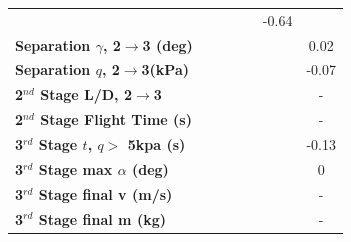 \begin{table}[ht]
\begin{tabular}{l c c c c c c}
	& \secondthirdSeparationvCdThreeNinetyNoReturn
	& \secondthirdSeparationvCdThreeStandardNoReturn
	& \secondthirdSeparationvCdThreeOneHundredTenNoReturn
	& \secondthirdSeparationvCdThreeOneHundredTwentyNoReturn
	&-0.64
	\\
	\textbf{Separation $\gamma$, 2$\rightarrow$3 (deg)}
	& \secondthirdSeparationgammaCdThreeEightyNoReturn
	& \secondthirdSeparationgammaCdThreeNinetyNoReturn
	& \secondthirdSeparationgammaCdThreeStandardNoReturn
	& \secondthirdSeparationgammaCdThreeOneHundredTenNoReturn
	& \secondthirdSeparationgammaCdThreeOneHundredTwentyNoReturn
	&0.02
	\\
	\textbf{Separation $q$, 2$\rightarrow$3(kPa)}
	& \secondthirdSeparationqCdThreeEightyNoReturn
	& \secondthirdSeparationqCdThreeNinetyNoReturn
	& \secondthirdSeparationqCdThreeStandardNoReturn
	& \secondthirdSeparationqCdThreeOneHundredTenNoReturn
	& \secondthirdSeparationqCdThreeOneHundredTwentyNoReturn
	&-0.07
	\\
	\textbf{2$^{nd}$ Stage L/D, 2$\rightarrow$3}
	& \secondthirdSeparationLDCdThreeEightyNoReturn
	& \secondthirdSeparationLDCdThreeNinetyNoReturn
	& \secondthirdSeparationLDCdThreeStandardNoReturn
	& \secondthirdSeparationLDCdThreeOneHundredTenNoReturn
	& \secondthirdSeparationLDCdThreeOneHundredTwentyNoReturn
	& -
	\\
	\textbf{2$^{nd}$ Stage Flight Time (s)}
	& \secondFlightTimeCdThreeEightyNoReturn
	& \secondFlightTimeCdThreeNinetyNoReturn
	& \secondFlightTimeCdThreeStandardNoReturn
	& \secondFlightTimeCdThreeOneHundredTenNoReturn
	& \secondFlightTimeCdThreeOneHundredTwentyNoReturn
	& -
	\\
	\textbf{3$^{rd}$ Stage $t$, $q >$ 5kpa (s)}
	& \thirdqOverFiveCdThreeEightyNoReturn
	& \thirdqOverFiveCdThreeNinetyNoReturn
	& \thirdqOverFiveCdThreeStandardNoReturn
	& \thirdqOverFiveCdThreeOneHundredTenNoReturn
	& \thirdqOverFiveCdThreeOneHundredTwentyNoReturn
	&-0.13
	\\
	\textbf{3$^{rd}$ Stage max $\alpha$ (deg)}
	& \thirdmaxAoACdThreeEightyNoReturn
	& \thirdmaxAoACdThreeNinetyNoReturn
	& \thirdmaxAoACdThreeStandardNoReturn
	& \thirdmaxAoACdThreeOneHundredTenNoReturn
	& \thirdmaxAoACdThreeOneHundredTwentyNoReturn
	&0
	\\
	\textbf{3$^{rd}$ Stage final v (m/s)}
	& \thirdcircvCdThreeEightyNoReturn
	& \thirdcircvCdThreeNinetyNoReturn
	& \thirdcircvCdThreeStandardNoReturn
	& \thirdcircvCdThreeOneHundredTenNoReturn
	& \thirdcircvCdThreeOneHundredTwentyNoReturn
	& -
	\\
	\textbf{3$^{rd}$ Stage final m (kg)}
	& \thirdcircmCdThreeEightyNoReturn
	& \thirdcircmCdThreeNinetyNoReturn
	& \thirdcircmCdThreeStandardNoReturn
	& \thirdcircmCdThreeOneHundredTenNoReturn
	& \thirdcircmCdThreeOneHundredTwentyNoReturn
	& -
	\\
	\hline 
\end{tabular} 

\end{table}

